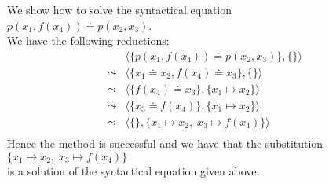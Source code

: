 \example
We show how to solve the syntactical equation \\[0.2cm]
\hspace*{1.3cm}  $p(x_1, f(x_4)) \doteq p( x_2, x_3)$.  \\[0.2cm]
We have the following reductions:
$$
\begin{array}{ll}
          &  \big\langle \big\{ p(x_1, f(x_4)) \doteq p( x_2, x_3) \big\}, \{ \} \big\rangle \\[0.2cm]
 \leadsto &  \big\langle \big\{ x_1 \doteq x_2, f(x_4) \doteq x_3 \big\}, \{ \} \big\rangle \\[0.2cm]
 \leadsto &  \big\langle \big\{ f(x_4) \doteq x_3 \big\}, \{ x_1 \mapsto x_2 \} \big\rangle \\[0.2cm]
 \leadsto &  \big\langle \big\{ x_3 \doteq f(x_4) \big\}, \{ x_1 \mapsto x_2 \} \big\rangle \\[0.2cm]
 \leadsto &  \big\langle \big\{\big\}, \{ x_1 \mapsto x_2,\; x_3 \mapsto f(x_4) \} \big\rangle \\[0.2cm]
\end{array}
$$
Hence the method is successful and we have that the substitution
\\[0.2cm]
\hspace*{1.3cm}
$\{ x_1 \mapsto x_2,\; x_3 \mapsto f(x_4) \}$ \\[0.2cm]
is a solution of the syntactical equation given above.  \eox

